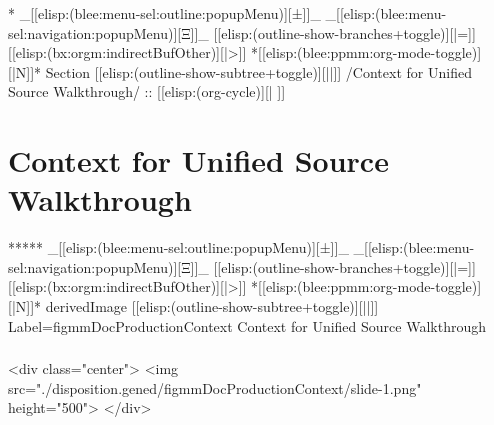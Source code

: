 \begin{whenOrg}
\begin{verblatex}
\begin{frame}[fragile,plain,label=rawBleeBootstrap]
\end{frame}
\end{verblatex}



\begin{whenOrg}
*  _[[elisp:(blee:menu-sel:outline:popupMenu)][±]]_ _[[elisp:(blee:menu-sel:navigation:popupMenu)][Ξ]]_ [[elisp:(outline-show-branches+toggle)][|=]] [[elisp:(bx:orgm:indirectBufOther)][|>]] *[[elisp:(blee:ppmm:org-mode-toggle)][|N]]*  Section    [[elisp:(outline-show-subtree+toggle)][||]]   /Context for Unified Source Walkthrough/ ::  [[elisp:(org-cycle)][| ]]
\end{whenOrg}

\section{Context for Unified Source Walkthrough}


\begin{whenOrg}
*****  _[[elisp:(blee:menu-sel:outline:popupMenu)][±]]_ _[[elisp:(blee:menu-sel:navigation:popupMenu)][Ξ]]_ [[elisp:(outline-show-branches+toggle)][|=]] [[elisp:(bx:orgm:indirectBufOther)][|>]] *[[elisp:(blee:ppmm:org-mode-toggle)][|N]]*  derivedImage [[elisp:(outline-show-subtree+toggle)][||]] Label=figmmDocProductionContext Context for Unified Source Walkthrough
\end{whenOrg}

\begin{htmlonly}

\begin{frame}[fragile,plain,label=figmmDocProductionContext]
    \frametitle{}
    \framesubtitle{}
    \begin{rawhtml}
<div class="center">
<img src="./disposition.gened/figmmDocProductionContext/slide-1.png" height="500">
</div>
    \end{rawhtml}
\end{frame}
\end{htmlonly}

\begin{verblatex}


\end{verblatex}
\end{whenOrg}
